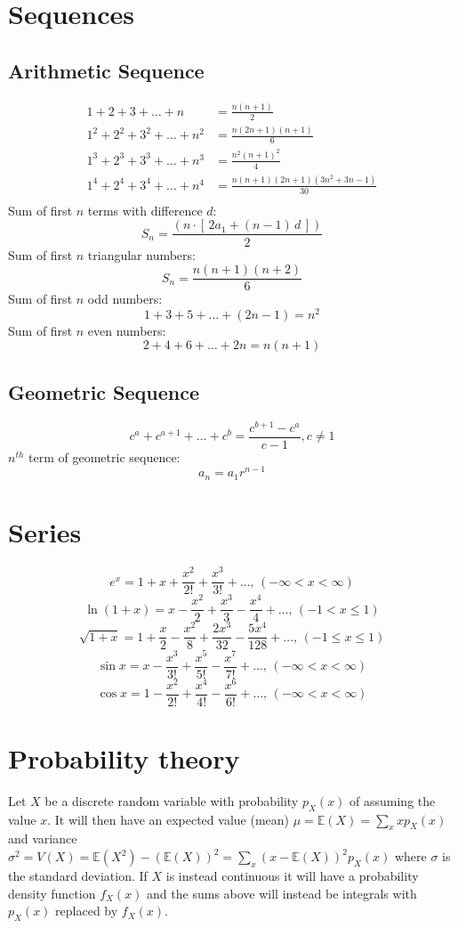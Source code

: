\section{Sequences}
\subsection{Arithmetic Sequence}
\begin{align*}
	1 + 2 + 3 + \dots + n &= \frac{n(n+1)}{2} \\
	1^2 + 2^2 + 3^2 + \dots + n^2 &= \frac{n(2n+1)(n+1)}{6} \\
	1^3 + 2^3 + 3^3 + \dots + n^3 &= \frac{n^2(n+1)^2}{4} \\
	1^4 + 2^4 + 3^4 + \dots + n^4 &= \frac{n(n+1)(2n+1)(3n^2 + 3n - 1)}{30} \\
\end{align*}
Sum of first $n$ terms with difference $d$:
$$S_n = \frac{(n\cdot \left[\,2a_1 + (n-1)\,d\,\right])}{2}$$
Sum of first $n$ triangular numbers:
$$S_n = \frac{n(n+1)(n+2)}{6}$$
Sum of first $n$ odd numbers:
$$1 + 3 + 5 + \dots + (2n-1) = n^2$$
Sum of first $n$ even numbers:
$$2 + 4 + 6 + \dots + 2n = n(n+1)$$
\subsection{Geometric Sequence}
\[ c^a + c^{a+1} + \dots + c^{b} = \frac{c^{b+1} - c^a}{c-1}, c \neq 1 \]
$n^{th}$ term of geometric sequence:
$$a_n = a_1r^{n-1}$$


\section{Series}
$$e^x = 1+x+\frac{x^2}{2!}+\frac{x^3}{3!}+\dots,\,(-\infty<x<\infty)$$
$$\ln(1+x) = x-\frac{x^2}{2}+\frac{x^3}{3}-\frac{x^4}{4}+\dots,\,(-1<x\leq1)$$
$$\sqrt{1+x} = 1+\frac{x}{2}-\frac{x^2}{8}+\frac{2x^3}{32}-\frac{5x^4}{128}+\dots,\,(-1\leq x\leq1)$$
$$\sin x = x-\frac{x^3}{3!}+\frac{x^5}{5!}-\frac{x^7}{7!}+\dots,\,(-\infty<x<\infty)$$
$$\cos x = 1-\frac{x^2}{2!}+\frac{x^4}{4!}-\frac{x^6}{6!}+\dots,\,(-\infty<x<\infty)$$

\section{Probability theory}
Let $X$ be a discrete random variable with probability $p_X(x)$ of assuming the value $x$. It will then have an expected value (mean) $\mu=\mathbb{E}(X)=\sum_xxp_X(x)$ and variance $\sigma^2=V(X)=\mathbb{E}(X^2)-(\mathbb{E}(X))^2=\sum_x(x-\mathbb{E}(X))^2p_X(x)$ where $\sigma$ is the standard deviation. If $X$ is instead continuous it will have a probability density function $f_X(x)$ and the sums above will instead be integrals with $p_X(x)$ replaced by $f_X(x)$.

